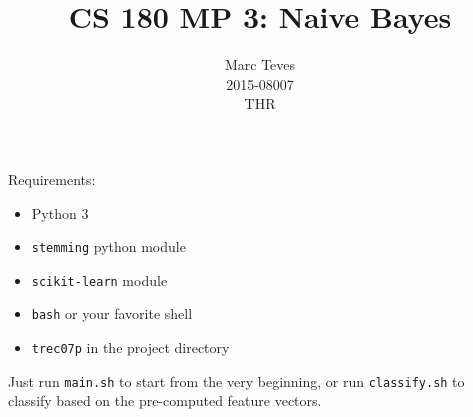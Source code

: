 \documentclass{article}
\begin{document}
	\title{CS 180 MP 3: Naive Bayes}
	\author{Marc Teves\\ 2015-08007\\ THR}
	\maketitle


	Requirements:
	\begin{itemize}
		\item Python 3
		\item \texttt{stemming} python module
		\item \texttt{scikit-learn} module
		\item \texttt{bash} or your favorite shell
		\item \texttt{trec07p} in the project directory
	\end{itemize}
	Just run \texttt{main.sh} to start from the very beginning, or run
	\texttt{classify.sh} to classify based on the pre-computed feature vectors.
\end{document}
